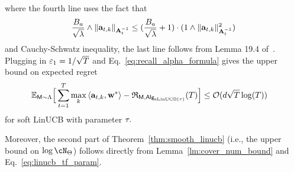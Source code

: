 where the fourth line uses the fact that
\begin{align*}
 \frac{B_a}{\sqrt{\lambda}}\wedge\|{\mathbf a}_{t,k}\|_{{\mathbf A}^{-1}_t}\leq (\frac{B_a}{\sqrt{\lambda}}+1)\cdot(1\wedge\|{\mathbf a}_{t,k}\|^2_{{\mathbf A}^{-1}_t})
\end{align*}
and Cauchy-Schwatz inequality, the last line follows from Lemma 19.4 of~\cite{lattimore2020bandit}. Plugging in $\varepsilon_1=1/\sqrt{T}$ and Eq.~\eqref{eq:recall_alpha_formula} gives the upper bound on expected regret 
\begin{align*}
\mathbb{E}_{{\mathsf{M}}\sim{\Lambda}}\Big[\sum_{t=1}^{T}\max_{k}\left\langle{\mathbf a}_{t,k},{\mathbf w}^*\right\rangle-{\mathfrak{R}}_{{\mathsf{M}},{\mathsf{Alg}}_{{\mathrm{sLinUCB}}({\tau})}}({T})\Big]&\leq\mathcal{O}(d\sqrt{T}\log(T))
\end{align*}
for soft LinUCB with parameter ${\tau}.$

Moreover, the second part of Theorem~\ref{thm:smooth_linucb} (i.e., the upper bound on $\log\cN_{\tfparspace}$) follows directly from Lemma~\ref{lm:cover_num_bound} and Eq.~\eqref{eq:linucb_tf_param}. 













































